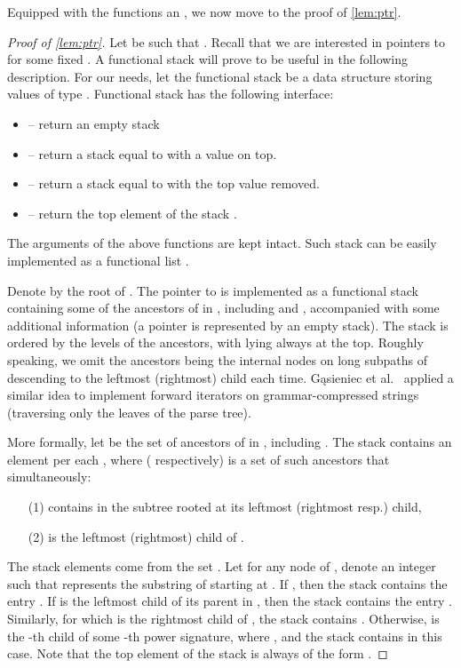 \documentclass[a4paper]{article}
\theoremstyle{remark}
\begin{document}
Equipped with the functions  an , we now move to the proof
of \cref{lem:ptr}.
\begin{proof}[Proof of \cref{lem:ptr}]
  Let  be such that .
  Recall that we are interested in pointers to  for some fixed
.
A functional stack will prove to be useful in the following description.
For our needs, let the functional stack be a data structure storing
values of type . Functional stack has the following interface:
\begin{itemize}
  \item  -- return an empty stack
  \item  -- return a stack  equal to  with a value  on top.
  \item  -- return a stack  equal to  with the top value removed.
  \item  -- return the top element of the stack .
\end{itemize}
The arguments of the above functions are kept intact.
Such stack can be easily implemented as a functional list \cite{Okasaki:1999}.

Denote by  the root of .
The pointer  to  is implemented as a functional stack containing
some of the ancestors of  in , including  and ,
accompanied with some additional information (a  pointer
is represented by an empty stack).
The stack is ordered by the levels of the ancestors, with 
lying always at the top.
Roughly speaking, we omit the ancestors being the internal nodes
on long subpaths of  descending to the leftmost (rightmost)
child each time. Gąsieniec et al.~\cite{DBLP:conf/dcc/GasieniecKPS05} applied a similar idea
to implement forward iterators on grammar-compressed strings (traversing only the leaves of the parse tree).

More formally, let  be the set of ancestors of  in ,
including .
The stack contains an element per each , where
 ( respectively) is a set of such ancestors  that  simultaneously:
\begin{itemize}
  \item[(1)] contains  in the subtree rooted at its leftmost (rightmost resp.) child,
  \item[(2)] is the leftmost (rightmost) child of .
\end{itemize}
The stack elements come from the set
.
Let for any node  of ,  denote an
integer such that  represents the substring of  starting at .
If , then the stack contains the entry .
If  is the leftmost child of its parent in , then the stack
contains the entry .
Similarly, for  which is the rightmost child of ,
the stack contains .
Otherwise,  is the -th child of some -th power signature, where
, and the stack contains  in this case.
Note that the top element of the stack is always of the form .


\end{proof}
\end{document}
